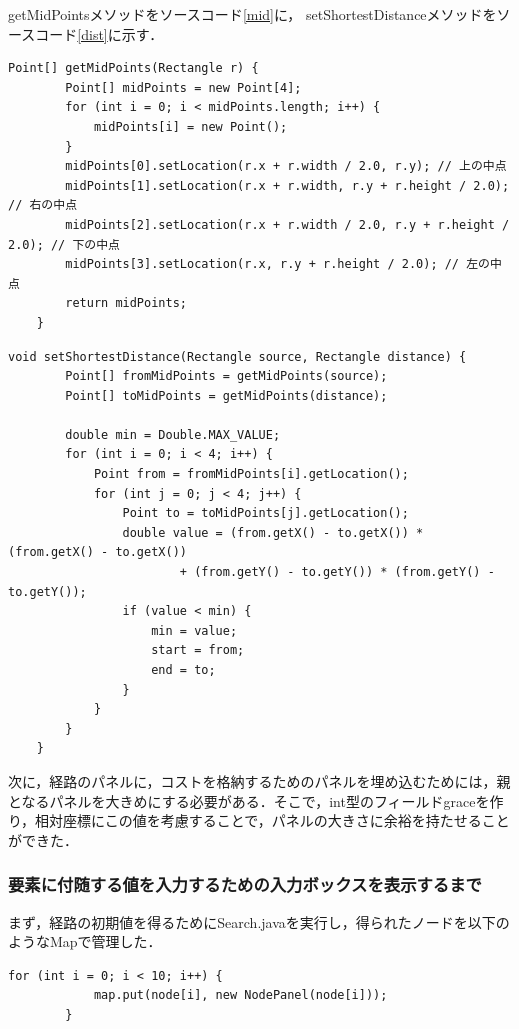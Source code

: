 \documentclass[12pt]{jarticle}
\begin{document}
getMidPointsメソッドをソースコード\ref{mid}に，
setShortestDistanceメソッドをソースコード\ref{dist}に示す．

\begin{lstlisting}[caption=getMidPointsメソッド, label=mid]
    Point[] getMidPoints(Rectangle r) {
        Point[] midPoints = new Point[4];
        for (int i = 0; i < midPoints.length; i++) {
            midPoints[i] = new Point();
        }
        midPoints[0].setLocation(r.x + r.width / 2.0, r.y); // 上の中点
        midPoints[1].setLocation(r.x + r.width, r.y + r.height / 2.0); // 右の中点
        midPoints[2].setLocation(r.x + r.width / 2.0, r.y + r.height / 2.0); // 下の中点
        midPoints[3].setLocation(r.x, r.y + r.height / 2.0); // 左の中点
        return midPoints;
    }
\end{lstlisting}

\begin{lstlisting}[caption=setShortestDistanceメソッド, label=dist]
    void setShortestDistance(Rectangle source, Rectangle distance) {
        Point[] fromMidPoints = getMidPoints(source);
        Point[] toMidPoints = getMidPoints(distance);

        double min = Double.MAX_VALUE;
        for (int i = 0; i < 4; i++) {
            Point from = fromMidPoints[i].getLocation();
            for (int j = 0; j < 4; j++) {
                Point to = toMidPoints[j].getLocation();
                double value = (from.getX() - to.getX()) * (from.getX() - to.getX())
                        + (from.getY() - to.getY()) * (from.getY() - to.getY());
                if (value < min) {
                    min = value;
                    start = from;
                    end = to;
                }
            }
        }
    }
\end{lstlisting}

次に，経路のパネルに，コストを格納するためのパネルを埋め込むためには，親となるパネルを大きめにする必要がある．そこで，int型のフィールドgraceを作り，相対座標にこの値を考慮することで，パネルの大きさに余裕を持たせることができた．

\subsubsection{要素に付随する値を入力するための入力ボックスを表示するまで}
まず，経路の初期値を得るためにSearch.javaを実行し，得られたノードを以下のようなMapで管理した．

\begin{lstlisting}[caption=mainメソッドの一部, label=map]
        for (int i = 0; i < 10; i++) {
            map.put(node[i], new NodePanel(node[i]));
        }
\end{lstlisting}
\end{document}
